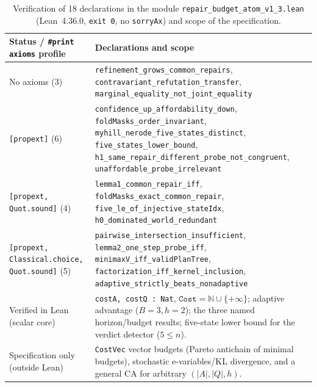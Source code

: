 \documentclass[11pt,a4paper]{article}
\theoremstyle{preprintthm}
\theoremstyle{preprintdef}
\begin{document}
\begin{table}[!htbp]
\centering
\caption{Verification of 18 declarations in the module \texttt{repair\_\allowbreak budget\_\allowbreak atom\_\allowbreak v1\_3.lean} (Lean~4.36.0, \texttt{exit 0}, no \texttt{sorryAx}) and scope of the specification.}
\label{tab:lean}
\footnotesize
\begin{tabularx}{\linewidth}{@{}l >{\raggedright\arraybackslash}X@{}}
\toprule
\textbf{Status / \texttt{\#print axioms} profile} & \textbf{Declarations and scope} \\
\midrule
No axioms (3) & \texttt{refinement\_grows\_common\_repairs}, \texttt{contravariant\_refutation\_transfer}, \texttt{marginal\_equality\_not\_joint\_equality} \\
\texttt{[propext]} (6) & \texttt{confidence\_up\_affordability\_down}, \texttt{foldMasks\_order\_invariant}, \texttt{myhill\_nerode\_five\_states\_distinct}, \texttt{five\_states\_lower\_bound}, \texttt{h1\_\allowbreak same\_\allowbreak repair\_\allowbreak different\_\allowbreak probe\_\allowbreak not\_\allowbreak congruent}, \texttt{unaffordable\_probe\_irrelevant} \\
\texttt{[propext, Quot.sound]} (4) & \texttt{lemma1\_common\_repair\_iff}, \texttt{foldMasks\_exact\_common\_repair}, \texttt{five\_le\_of\_injective\_stateIdx}, \texttt{h0\_dominated\_world\_redundant} \\
\texttt{[propext, Classical.choice, Quot.sound]} (5) & \texttt{pairwise\_intersection\_insufficient}, \texttt{lemma2\_one\_step\_probe\_iff}, \texttt{minimaxV\_iff\_validPlanTree}, \texttt{factorization\_iff\_kernel\_inclusion}, \texttt{adaptive\_\allowbreak strictly\_\allowbreak beats\_\allowbreak nonadaptive} \\
\midrule
Verified in Lean (scalar core) & \texttt{costA, costQ : Nat}, $\texttt{Cost}=\mathbb N\cup\{+\infty\}$; adaptive advantage ($B=3,h=2$); the three named horizon/budget results; five-state lower bound for the verdict detector ($5\le n$). \\
Specification only (outside Lean) & \texttt{CostVec} vector budgets (Pareto antichain of minimal budgets), stochastic e-variables/KL divergence, and a general CA for arbitrary $(|A|,|Q|,h)$. \\
\bottomrule
\end{tabularx}
\end{table}
\end{document}
